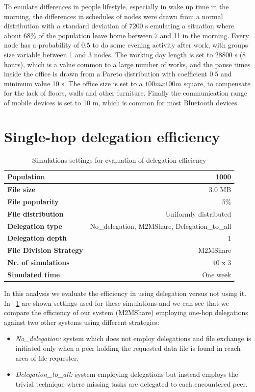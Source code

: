 To emulate differences in people lifestyle, especially in wake up time in the morning, the differences in schedules of nodes were drawn from a normal distribution with a standard deviation of 7200 s emulating a situation where about 68\% of the population leave home between 7 and 11 in the morning. Every node has a probability of 0.5 to do some evening activity after work, with groups size variable between 1 and 3 nodes. The working day length is set to 28800 s (8 hours), which is a value common to a large number of works, and the pause times inside the office is drawn from a Pareto distribution with coefficient 0.5 and minimum value 10 s. The office size is set to a $100 m x 100 m$ square, to compensate for the lack of floors, walls and other furniture. Finally the communication range of mobile devices is set to 10 m, which is common for most Bluetooth devices.
\\

\newpage
\section{Single-hop delegation efficiency}
\label{analisiDelegationEfficiency}
\begin{table}[h]
\begin{center}
\begin{tabular}{|l|r|}
\hline
\bfseries Population & 1000 \\
\hline
\bfseries File size & 3.0 MB \\
\hline
\bfseries File popularity & 5\% \\
\hline
\bfseries File distribution & Uniformly distributed \\
\hline
\bfseries Delegation type & No\_delegation, M2MShare, Delegation\_to\_all \\
\hline
\bfseries Delegation depth & 1 \\
\hline
\bfseries File Division Strategy & M2MShare \\
\hline
\bfseries Nr. of simulations & 40 x 3\\
\hline
\bfseries Simulated time & One week \\
\hline
\end{tabular}
\end{center}
\caption{Simulations settings for evaluation of delegation efficiency\label{tab:settingsIniziali}}
\end{table}
In this analysis we evaluate the efficiency in using delegation versus not using it. In \tablename~\ref{tab:settingsIniziali} are shown settings used for these simulations and we can see that we compare the efficiency of our system (M2MShare) employing one-hop delegations against two other systems using different strategies:
\begin{itemize}
\item \textit{No\_delegation:} system which does not employ delegations and file exchange is initiated only when a peer holding the requested data file is found in reach area of file requester.
\item \textit{Delegation\_to\_all:} system employing delegations but instead employs the trivial technique where missing tasks are delegated to each encountered peer.
\end{itemize}

